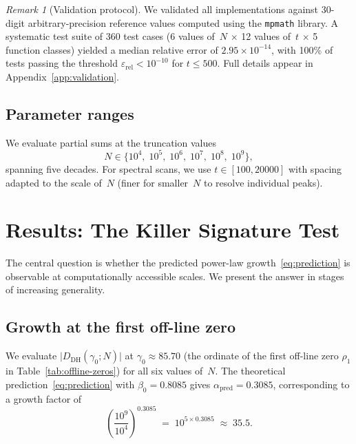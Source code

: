 \documentclass[11pt]{amsart}
\theoremstyle{definition}
\theoremstyle{remark}
\newtheorem{remark}[theorem]{Remark}
\renewcommand{\DH}{\mathrm{DH}}
\newcommand{\abs}[1]{\lvert #1 \rvert}
\begin{document}
\begin{remark}[Validation protocol]
We validated all implementations against 30-digit arbitrary-precision
reference values computed using the \texttt{mpmath} library.  A
systematic test suite of 360 test cases (6 values of~$N$ $\times$ 12
values of~$t$ $\times$ 5 function classes) yielded a median relative
error of $2.95 \times 10^{-14}$, with 100\% of tests passing the
threshold $\varepsilon_{\mathrm{rel}} < 10^{-10}$ for
$t \le 500$.  Full details appear in Appendix~\ref{app:validation}.
\end{remark}

\subsection{Parameter ranges}

We evaluate partial sums at the truncation values
\begin{equation}\label{eq:N-values}
  N \in \{10^4,\; 10^5,\; 10^6,\; 10^7,\; 10^8,\; 10^9\},
\end{equation}
spanning five decades.  For spectral scans, we use
$t \in [100, 20000]$ with spacing adapted to the scale of~$N$
(finer for smaller~$N$ to resolve individual peaks).

\section{Results: The Killer Signature Test}\label{sec:results}

The central question is whether the predicted power-law
growth~\eqref{eq:prediction} is observable at computationally
accessible scales.  We present the answer in stages of increasing
generality.

\subsection{Growth at the first off-line zero}\label{ssec:first-zero}

We evaluate $\abs{D_{\DH}(\gamma_0; N)}$ at
$\gamma_0 \approx 85.70$ (the ordinate of the first off-line zero
$\rho_1$ in Table~\ref{tab:offline-zeros}) for all six values
of~$N$.  The theoretical prediction~\eqref{eq:prediction} with
$\beta_0 = 0.8085$ gives $\alpha_{\mathrm{pred}} = 0.3085$,
corresponding to a growth factor of
\begin{equation}\label{eq:growth-factor}
  \left(\frac{10^9}{10^4}\right)^{0.3085}
  \;=\; 10^{5 \times 0.3085}
  \;\approx\; 35.5.
\end{equation}
\end{document}
